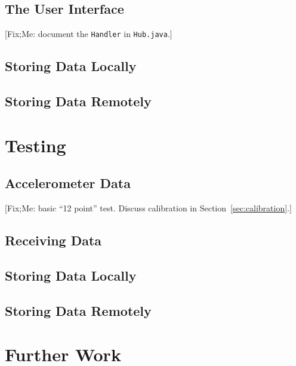 \documentclass[11pt, a4paper, oneside, english]{scrbook}
\begin{document}
\section{The User Interface} %
\label{sec:the_user_interface}
[Fix;Me: document the \texttt{Handler} in \texttt{Hub.java}.]
\section{Storing Data Locally} %
\label{sec:storing_data_locally}

\section{Storing Data Remotely} %
\label{sec:storing_data_remotely}

\chapter{Testing} %
\label{cha:testing}
\section{Accelerometer Data} %
\label{sec:accelerometer_data}
[Fix;Me: basic ``12 point'' test. Discuss calibration in Section~\ref{sec:calibration}.]
\section{Receiving Data} %
\label{sec:receiving_data}

\section{Storing Data Locally} %
\label{sec:test_data_locally}

\section{Storing Data Remotely} %
\label{sec:test_data_remotely}

\chapter{Further Work} %
\label{cha:further_work}
\end{document}
